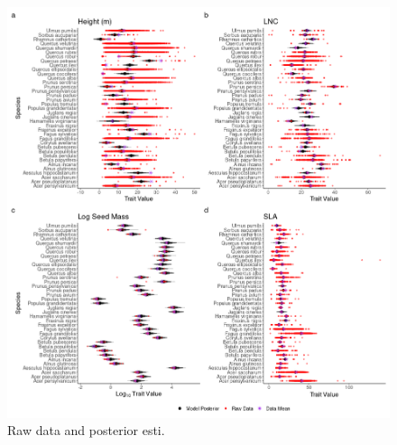 \documentclass{article}\usepackage[]{graphicx}\usepackage[]{color}
\begin{document}
\begin{figure}[h!]
    \centering
 \includegraphics[width=\textwidth]{..//..//analyses/traits/figures/FourTraitFit_37spp.png} 
    \caption{Raw data and posterior esti.}
    \label{figure:TraitDistributions}
\end{figure}
\end{document}
